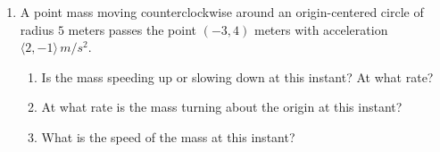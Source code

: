 \documentclass{ximera}
\begin{document}
\begin{question}
\begin{enumerate}
\item A point mass moving counterclockwise around an origin-centered circle of radius $5$ meters passes the point $(-3,4)$ meters with acceleration $\langle 2, -1\rangle \, m/s^2$.  

\begin{enumerate}
\item Is the mass speeding up or slowing down at this instant? At what rate?

\item At what rate is the mass turning about the origin at this instant?

\item What is the speed of the mass at this instant?

\begin{freeResponse}
\end{freeResponse}
\end{enumerate}

\end{enumerate}

\end{question}
\end{document}
